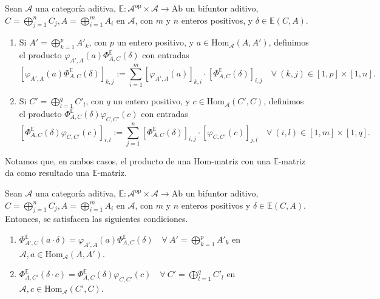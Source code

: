 \documentclass[tesis]{subfiles}
\begin{document}
\begin{Def}
    Sean $\mathscr{A}$ una categoría aditiva, $\mathbb{E}:\mathscr{A}^\text{op}\times\mathscr{A}\to\text{Ab}$ un bifuntor aditivo, $C=\bigoplus_{j=1}^n C_j, A=\bigoplus_{i=1}^m A_i$ en $\mathscr{A}$, con $m$ y $n$ enteros positivos, y $\delta\in\mathbb{E}(C,A)$.

    \begin{enumerate}[label=(\alph*)]
    
        \item Si $A'=\bigoplus_{k=1}^p A'_k$, con $p$ un entero positivo, y $a\in\text{Hom}_\mathscr{A}(A,A')$, definimos el producto $\varphi_{A',A}(a)\Phi^\mathbb{E}_{A,C}(\delta)$ con entradas
            \[
                [\varphi_{A',A}(a)\Phi^\mathbb{E}_{A,C}(\delta)]_{k,j} := \sum_{i=1}^m [\varphi_{A',A}(a)]_{k,i} \cdot [\Phi^\mathbb{E}_{A,C}(\delta)]_{i,j} \quad \forall \ (k,j)\in[1,p]\times[1,n].
            \] 
            
        \item Si $C' = \bigoplus_{l=1}^q C'_l$, con $q$ un entero positivo, y $c\in\text{Hom}_\mathscr{A}(C',C)$, definimos el producto $\Phi^\mathbb{E}_{A,C}(\delta)\varphi_{C,C'}(c)$ con entradas
            \[
                [\Phi^\mathbb{E}_{A,C}(\delta)\varphi_{C,C'}(c)]_{i,l} := \sum_{j=1}^n [\Phi^\mathbb{E}_{A,C}(\delta)]_{i,j} \cdot [\varphi_{C,C'}(c)]_{j,l} \quad \forall \ (i,l)\in[1,m]\times[1,q].
            \] 
    \end{enumerate}
    Notamos que, en ambos casos, el producto de una Hom-matriz con una $\mathbb{E}$-matriz da como resultado una $\mathbb{E}$-matriz.
\end{Def}

\begin{Prop}\label{Prop: Multiplicación de matrices con E-matrices y compatibilidad con acciones de bimódulo}
    Sean $\mathscr{A}$ una categoría aditiva, $\mathbb{E}:\mathscr{A}^\text{op}\times\mathscr{A}\to   \text{Ab}$ un bifuntor aditivo, $C=\bigoplus_{j=1}^n C_j, A=\bigoplus_{i=1}^mA_i$ en $\mathscr{A}$, con $m$ y $n$ enteros positivos y $\delta\in\mathbb{E}(C,A)$. Entonces, se satisfacen las siguientes condiciones.

    \begin{enumerate}[label=(\alph*)]
    
        \item $\Phi^\mathbb{E}_{A',C}(a\cdot\delta) = \varphi_{A',A}(a)\Phi^\mathbb{E}_{A,C}(\delta) \quad \forall \ A'=\bigoplus_{k=1}^p A'_k$ en $\mathscr{A}, a\in\text{Hom}_\mathscr{A}(A,A')$.
    
        \item $\Phi^\mathbb{E}_{A,C'}(\delta\cdot c) = \Phi^\mathbb{E}_{A,C}(\delta)\varphi_{C,C'}(c) \quad \forall \ C'=\bigoplus_{l=1}^q C'_l$ en $\mathscr{A}, c\in\text{Hom}_\mathscr{A}(C',C)$.
    \end{enumerate}
\end{Prop}
\end{document}
